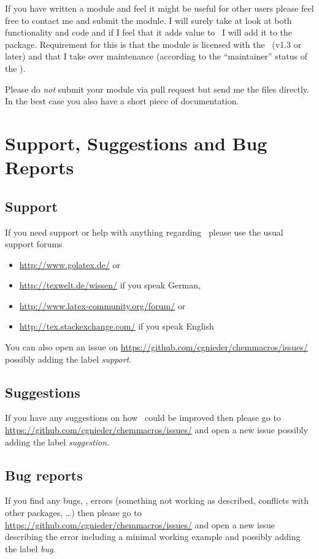 \documentclass{chemmacros-manual}
\begin{document}
If you have written a module and feel it might be useful for other users
please feel free to contact me and submit the module.  I will surely take at
look at both functionality and code and if I feel that it adds value to
\chemmacros\ I will add it to the package.  Requirement for this is that the
module is licensed with the \LPPL\ (v1.3 or later) and that I take over
maintenance (according to the \enquote{maintainer} status of the \lppl).

Please do \emph{not} submit your module via pull request but send me the files
directly.  In the best case you also have a short piece of documentation.

\section{Support, Suggestions and Bug Reports}\label{sec:sugg-bug-reports}

\subsection{Support}
If you need support or help with anything regarding \chemmacros\ please use
the usual support forums
\begin{itemize}
  \item \url{http://www.golatex.de/} or
  \item \url{http://texwelt.de/wissen/} if you speak German,
  \item \url{http://www.latex-community.org/forum/} or
  \item \url{http://tex.stackexchange.com/} if you speak English
\end{itemize}
You can also open an issue on
\url{https://github.com/cgnieder/chemmacros/issues/} possibly adding the label
\emph{support}.
  
\subsection{Suggestions}
If you have any suggestions on how \chemmacros\ could be improved then please
go to \url{https://github.com/cgnieder/chemmacros/issues/} and open a new
issue possibly adding the label \emph{suggestion}.

\subsection{Bug reports}
If you find any bugs, \ie, errors (something not working as described,
conflicts with other packages, \ldots) then please go to
\url{https://github.com/cgnieder/chemmacros/issues/} and open a new issue
describing the error including a minimal working example and possibly adding
the label \emph{bug}.

\printbibliography
\end{document}
